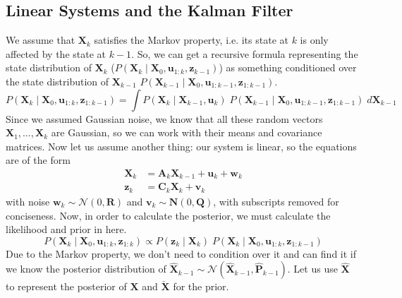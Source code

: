 \documentclass{article}
\theoremstyle{definition}
\theoremstyle{remark}
\theoremstyle{definition}
\begin{document}
\subsection{Linear Systems and the Kalman Filter}
We assume that $\mathbf{X}_k$ satisfies the Markov property, i.e. its state at $k$ is only affected by the state at $k-1$. So, we can get a recursive formula representing the state distribution of $\mathbf{X}_k$ ($P(\mathbf{X}_k \mid \mathbf{X}_0, \mathbf{u}_{1:k}, \mathbf{z}_{k-1})$) as something conditioned over the state distribution of $\mathbf{X}_{k-1}$ $P(\mathbf{X}_{k-1} \mid \mathbf{X}_0, \mathbf{u}_{1:k-1}, \mathbf{z}_{1:k-1})$. 
\[P(\mathbf{X}_k \mid \mathbf{X}_0, \mathbf{u}_{1:k}, \mathbf{z}_{1:k-1}) = \int P(\mathbf{X}_k \mid \mathbf{X}_{k-1}, \mathbf{u}_{k}) \; P (\mathbf{X}_{k-1} \mid \mathbf{X}_0, \mathbf{u}_{1:k-1}, \mathbf{z}_{1:k-1}) \; d \mathbf{X}_{k-1}\]
Since we assumed Gaussian noise, we know that all these random vectors $\mathbf{X}_1, \ldots, \mathbf{X}_k$ are Gaussian, so we can work with their means and covariance matrices. Now let us assume another thing: our system is linear, so the equations are of the form 
\begin{align*}
    \mathbf{X}_{k} & = \mathbf{A}_k \mathbf{X}_{k-1} + \mathbf{u}_k + \mathbf{w}_k \\
    \mathbf{z}_{k} & = \mathbf{C}_k \mathbf{X}_k + \mathbf{v}_{k}
\end{align*}
with noise $\mathbf{w}_k \sim \mathcal{N}(0, \mathbf{R})$ and $\mathbf{v}_{k} \sim \mathbf{N}(0, \mathbf{Q})$, with subscripts removed for conciseness. Now, in order to calculate the posterior, we must calculate the likelihood and prior in here. 
\[P (\mathbf{X}_k \mid \mathbf{X}_0, \mathbf{u}_{1:k}, \mathbf{z}_{1:k}) \propto P(\mathbf{z}_k \mid \mathbf{X}_k) \; P(\mathbf{X}_k \mid \mathbf{X}_0, \mathbf{u}_{1:k}, \mathbf{z}_{1:k-1})\]
Due to the Markov property, we don't need to condition over it and can find it if we know the posterior distribution of $\hat{\mathbf{X}}_{k-1} \sim \mathcal{N}(\hat{\mathbf{X}}_{k-1}, \hat{\mathbf{P}}_{k-1})$. Let us use $\hat{\mathbf{X}}$ to represent the posterior of $\mathbf{X}$ and $\check{\mathbf{X}}$ for the prior. 
\end{document}
